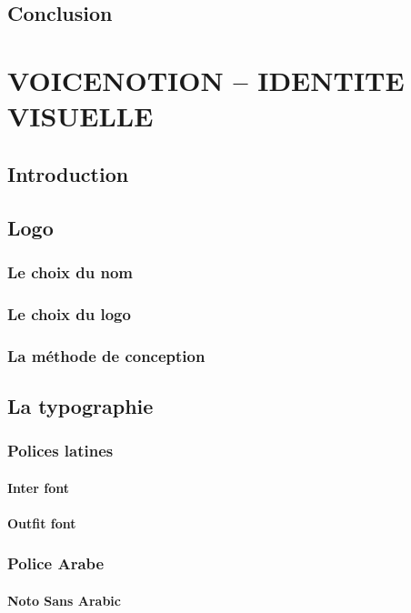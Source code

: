 \section{Conclusion}

\chapter{VOICENOTION -- IDENTITE VISUELLE}

\section{Introduction}
\section{Logo}
\subsection{Le choix du nom}
\subsection{Le choix du logo}
\subsection{La méthode de conception}

\section{La typographie}
\subsection{Polices latines}
\subsubsection{Inter font}
\subsubsection{Outfit font}
\subsection{Police Arabe}
\subsubsection{Noto Sans Arabic}

